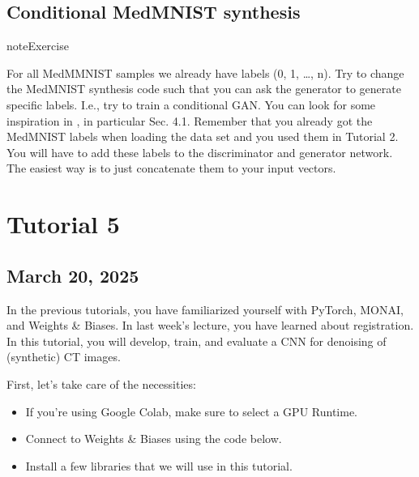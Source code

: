 \documentclass[letterpaper,10pt,english]{jupyterBook}
\begin{document}
\section{Conditional MedMNIST synthesis}
\label{\detokenize{notebooks/Tutorial4_Generative_Models/Tutorial4_Generative_Models_student:conditional-medmnist-synthesis}}
\begin{sphinxadmonition}{note}{Exercise}

\sphinxAtStartPar
For all MedMMNIST samples we already have labels (0, 1, …, n). Try to change the MedMNIST synthesis code such that you can ask the generator to generate specific labels. I.e., try to train a conditional GAN. You can look for some inspiration in , in particular Sec. 4.1. Remember that you already got the MedMNIST labels when loading the data set and you used them in Tutorial 2. You will have to add these labels to the discriminator and generator network. The easiest way is to just concatenate them to your input vectors.
\end{sphinxadmonition}

\sphinxstepscope


\chapter{Tutorial 5}
\label{\detokenize{notebooks/Tutorial5_Reconstruction/Tutorial5_Reconstruction_student:tutorial-5}}\label{\detokenize{notebooks/Tutorial5_Reconstruction/Tutorial5_Reconstruction_student::doc}}

\section{March 20, 2025}
\label{\detokenize{notebooks/Tutorial5_Reconstruction/Tutorial5_Reconstruction_student:march-20-2025}}
\sphinxAtStartPar
In the previous tutorials, you have familiarized yourself with PyTorch, MONAI, and Weights \& Biases. In last week’s lecture, you have learned about registration. In this tutorial, you will develop, train, and evaluate a CNN for denoising of (synthetic) CT images.

\sphinxAtStartPar
First, let’s take care of the necessities:
\begin{itemize}
\item {} 
\sphinxAtStartPar
If you’re using Google Colab, make sure to select a GPU Runtime.

\item {} 
\sphinxAtStartPar
Connect to Weights \& Biases using the code below.

\item {} 
\sphinxAtStartPar
Install a few libraries that we will use in this tutorial.

\end{itemize}
\end{document}
